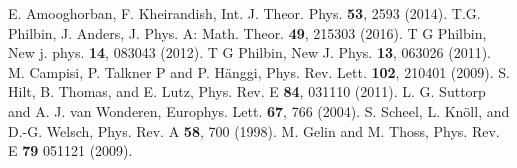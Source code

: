 \documentclass[preprint,showpacs,showkeys,groupedaddress,superscriptaddress]{revtex4}
\begin{document}
\begin{thebibliography}{10}
 E. Amooghorban, F. Kheirandish, Int. J. Theor. Phys. \textbf{53}, 2593 (2014).
 T.G. Philbin, J. Anders, J. Phys. A: Math. Theor. \textbf{49}, 215303 (2016).
 T G Philbin, New j. phys. \textbf{14}, 083043 (2012).
 T G Philbin, New J. Phys. \textbf{13}, 063026 (2011).
 M. Campisi, P. Talkner P and P. H\"{a}nggi, Phys. Rev. Lett. \textbf{102}, 210401 (2009).
 S. Hilt, B. Thomas, and E. Lutz, Phys. Rev. E \textbf{84}, 031110 (2011).
 L. G. Suttorp and A. J. van Wonderen, Europhys. Lett. \textbf{67}, 766 (2004).
 S. Scheel, L. Knöll, and D.-G. Welsch, Phys. Rev. A \textbf{58}, 700  (1998).
 M. Gelin and M. Thoss, Phys. Rev. E \textbf{79} 051121 (2009).
\end{thebibliography}
\end{document}
